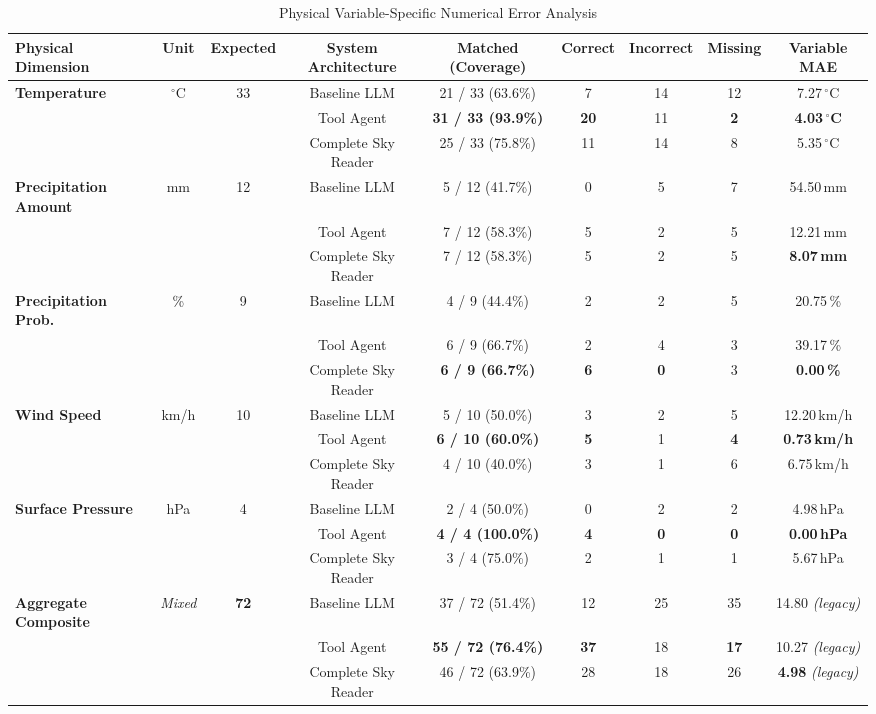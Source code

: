 \documentclass[conference]{IEEEtran}
\begin{document}
\begin{table}[t]
\caption{Physical Variable-Specific Numerical Error Analysis}
\label{tab:physical_mae}
\centering
\begin{tabular}{lcccccccc}
\toprule
\textbf{Physical Dimension} & \textbf{Unit} & \textbf{Expected} & \textbf{System Architecture} & \textbf{Matched (Coverage)} & \textbf{Correct} & \textbf{Incorrect} & \textbf{Missing} & \textbf{Variable MAE} \\
\midrule
\textbf{Temperature} & $^\circ$C & 33 & Baseline LLM & 21 / 33 (63.6\%) & 7 & 14 & 12 & 7.27\,$^\circ$C \\
& & & Tool Agent & \textbf{31 / 33 (93.9\%)} & \textbf{20} & 11 & \textbf{2} & \textbf{4.03\,$^\circ$C} \\
& & & Complete Sky Reader & 25 / 33 (75.8\%) & 11 & 14 & 8 & 5.35\,$^\circ$C \\
\midrule
\textbf{Precipitation Amount} & mm & 12 & Baseline LLM & 5 / 12 (41.7\%) & 0 & 5 & 7 & 54.50\,mm \\
& & & Tool Agent & 7 / 12 (58.3\%) & 5 & 2 & 5 & 12.21\,mm \\
& & & Complete Sky Reader & 7 / 12 (58.3\%) & 5 & 2 & 5 & \textbf{8.07\,mm} \\
\midrule
\textbf{Precipitation Prob.} & \% & 9 & Baseline LLM & 4 / 9 (44.4\%) & 2 & 2 & 5 & 20.75\,\% \\
& & & Tool Agent & 6 / 9 (66.7\%) & 2 & 4 & 3 & 39.17\,\% \\
& & & Complete Sky Reader & \textbf{6 / 9 (66.7\%)} & \textbf{6} & \textbf{0} & 3 & \textbf{0.00\,\%} \\
\midrule
\textbf{Wind Speed} & km/h & 10 & Baseline LLM & 5 / 10 (50.0\%) & 3 & 2 & 5 & 12.20\,km/h \\
& & & Tool Agent & \textbf{6 / 10 (60.0\%)} & \textbf{5} & 1 & \textbf{4} & \textbf{0.73\,km/h} \\
& & & Complete Sky Reader & 4 / 10 (40.0\%) & 3 & 1 & 6 & 6.75\,km/h \\
\midrule
\textbf{Surface Pressure} & hPa & 4 & Baseline LLM & 2 / 4 (50.0\%) & 0 & 2 & 2 & 4.98\,hPa \\
& & & Tool Agent & \textbf{4 / 4 (100.0\%)} & \textbf{4} & \textbf{0} & \textbf{0} & \textbf{0.00\,hPa} \\
& & & Complete Sky Reader & 3 / 4 (75.0\%) & 2 & 1 & 1 & 5.67\,hPa \\
\midrule
\textbf{Aggregate Composite} & \textit{Mixed} & \textbf{72} & Baseline LLM & 37 / 72 (51.4\%) & 12 & 25 & 35 & 14.80 \textit{(legacy)} \\
& & & Tool Agent & \textbf{55 / 72 (76.4\%)} & \textbf{37} & 18 & \textbf{17} & 10.27 \textit{(legacy)} \\
& & & Complete Sky Reader & 46 / 72 (63.9\%) & 28 & 18 & 26 & \textbf{4.98} \textit{(legacy)} \\
\bottomrule
\end{tabular}
\end{table}
\end{document}
